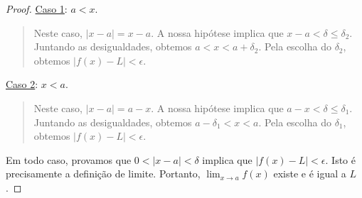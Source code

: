 \begin{proof}
	\uline{Caso 1}: $a < x$.
		
	\begin{quote}
		Neste caso, $|x-a|=x-a$. A nossa hipótese implica que $x-a<\delta\leq\delta_2$. Juntando as desigualdades, obtemos
		$a < x < a+\delta_2$. Pela escolha do $\delta_2$, obtemos $|f(x)-L|<\epsilon$.
	\end{quote}
	
	\uline{Caso 2}: $x < a$.
		
	\begin{quote}
		Neste caso, $|x-a|=a-x$. A nossa hipótese implica que $a-x<\delta\leq\delta_1$. Juntando as desigualdades, obtemos
		$a-\delta_1 < x < a$. Pela escolha do $\delta_1$, obtemos $|f(x)-L|<\epsilon$.
	\end{quote}
	
	Em todo caso, provamos que $0<|x-a|<\delta$ implica que $|f(x)-L|<\epsilon$. Isto é precisamente a definição de limite. Portanto, $\lim_{x\to a}f(x)$ existe e é igual a $L$.
\end{proof}